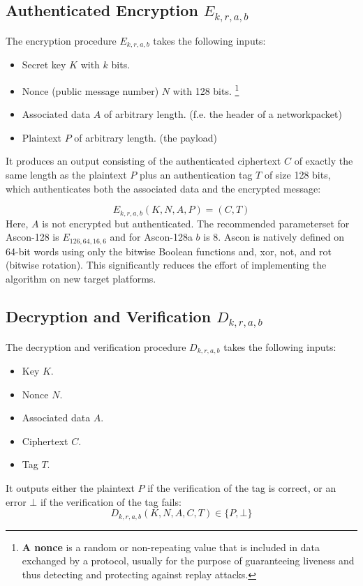 \subsection{Authenticated Encryption $E_{k,r,a,b}$}
The encryption procedure $E_{k,r,a,b}$ takes the following inputs:
\begin{itemize}
    \item Secret key $K$ with $k$ bits.
    \item Nonce (public message number) $N$ with 128 bits. \footnote[2]{\textbf{A nonce} is a random or non-repeating value that is included in data
    exchanged by a protocol, usually for the purpose of guaranteeing
    liveness and thus detecting and protecting against replay attacks.\cite{rfc4949}} %
    \item Associated data $A$ of arbitrary length. (f.e. the header of a networkpacket)
    \item Plaintext $P$ of arbitrary length. (the payload)
\end{itemize}
It produces an output consisting of the authenticated ciphertext $C$ of exactly the same length as the plaintext $P$ plus an authentication tag $T$ of size 128 bits, which authenticates both the associated data and the encrypted message:

\[
E_{k,r,a,b}(K,N,A,P) = (C,T)
\]
Here, $A$ is not encrypted but authenticated. 
The recommended parameterset for Ascon-128 is $E_{126,64,16,6}$ and for Ascon-128a $b$ is 8. \cite[Chapter 2.2]{Ascon-v1.2} \newline
Ascon is natively deﬁned on 64-bit words using only the bitwise
Boolean functions and, xor, not, and rot (bitwise rotation). This signiﬁcantly
reduces the eﬀort of implementing the algorithm on new target platforms. \cite[Chapter 4.1]{Ascon-v1.2} %

\subsection{Decryption and Verification $D_{k,r,a,b}$}
The decryption and verification procedure $D_{k,r,a,b}$ takes the following inputs:
\begin{itemize}
    \item Key $K$.
    \item Nonce $N$.
    \item Associated data $A$.
    \item Ciphertext $C$.
    \item Tag $T$.
\end{itemize}
It outputs either the plaintext $P$ if the verification of the tag is correct, or an error $\bot$ if the verification of the tag fails:
\[
D_{k,r,a,b}(K,N,A,C,T) \in \{P, \bot\}
\]
\cite{Ascon-v1.2}

